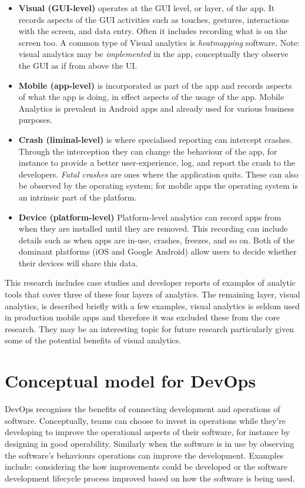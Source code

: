 \begin{itemize}
    \item \textbf{Visual (GUI-level)} operates at the GUI level, or layer, of the app. It records aspects of the GUI activities such as touches, gestures, interactions with the screen, and data entry. Often it includes recording what is on the screen too. A common type of Visual analytics is \emph{heatmapping} software. Note: visual analytics may be \emph{implemented} in the app, conceptually they observe the GUI as if from above the UI.
    \item \textbf{Mobile (app-level)} is incorporated as part of the app and records aspects of what the app is doing, in effect aspects of the usage of the app. Mobile Analytics is prevalent in Android apps and already used for various business purposes.
    \item \textbf{Crash (liminal-level)} is where specialised reporting can intercept crashes. Through the interception they can change the behaviour of the app, for instance to provide a better user-experience, log, and report the crash to the developers. \emph{Fatal crashes} are ones where the application quits. These can also be observed by the operating system; for mobile apps the operating system is an intrinsic part of the platform.
    \item \textbf{Device (platform-level)} Platform-level analytics can record apps from when they are installed until they are removed. This recording can include details such as when apps are in-use, crashes, freezes, and so on. Both of the dominant platforms (iOS and Google Android) allow users to decide whether their devices will share this data.
\end{itemize}


This research includes case studies and developer reports of examples of analytic tools that cover three of these four layers of analytics. The remaining layer, visual analytics, is described briefly with a few examples, visual analytics is seldom used in production mobile apps and therefore it was excluded these from the core research. They may be an interesting topic for future research particularly given some of the potential benefits of visual analytics. %


\section{Conceptual model for DevOps}
DevOps recognises the benefits of connecting development and operations of software. Conceptually, teams can choose to invest in operations while they're developing to improve the operational aspects of their software, for instance by designing in good operability. Similarly when the software is in use by observing the software's behaviours operations can improve the development. Examples include: considering the how improvements could be developed or the software development lifecycle process improved based on how the software is being used.


